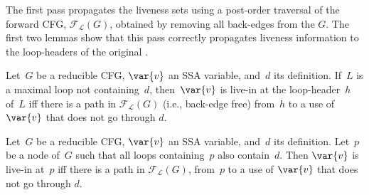 

The first pass propagates the liveness sets using a post-order traversal of the 
forward CFG, $\mathcal{F}_\mathcal{L}(G)$, obtained by removing all back-edges 
from the \@CFG $G$.
The first two lemmas show that this pass correctly propagates liveness information to the loop-headers of the original \@CFG.
\begin{lemma}
	\label{lemma:firstpass}
	Let~$G$ be a reducible CFG, $\var{v}$ an SSA variable, and~$d$ its definition.
        If~$L$ is a maximal loop not containing~$d$, then~$\var{v}$ is live-in 
        at the loop-header~$h$ of~$L$ iff there is a path in 
        $\mathcal{F}_\mathcal{L}(G)$ (i.e., back-edge free) from~$h$ to a use 
        of $\var{v}$ that does not go through $d$.
\end{lemma}

\begin{lemma}
	\label{lemma:firstpass2}
	Let~$G$ be a reducible CFG, $\var{v}$ an SSA variable, and~$d$ its definition.
	Let~$p$ be a node of~$G$ such that all loops containing~$p$ also contain~$d$.
        Then $\var{v}$ is live-in at~$p$ iff there is a path in 
        $\mathcal{F}_\mathcal{L}(G)$, from~$p$ to a use of $\var{v}$ that does 
        not go through $d$.
\end{lemma}

